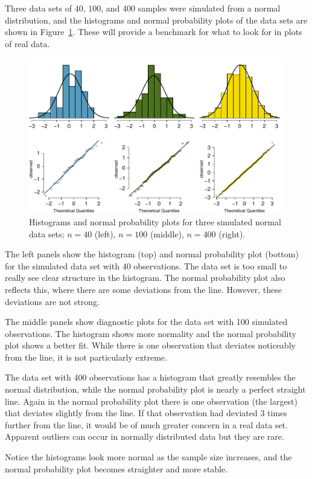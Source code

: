 \begin{example}{Three data sets of 40, 100, and 400 samples were simulated from a normal distribution, and the histograms and normal probability plots of the data sets are shown in Figure~\ref{normalExamples}. These will provide a benchmark for what to look for in plots of real data.} \label{normalExamplesExample}

\begin{figure}
\centering
\includegraphics[width=\textwidth]{02/figures/normalExamples/normalExamples}
\caption{Histograms and normal probability plots for three simulated normal data sets; $n=40$ (left), $n=100$ (middle), $n=400$ (right).}
\label{normalExamples}
\end{figure}

The left panels show the histogram (top) and normal probability plot (bottom) for the simulated data set with 40 observations. The data set is too small to really see clear structure in the histogram. The normal probability plot also reflects this, where there are some deviations from the line. However, these deviations are not strong.

The middle panels show diagnostic plots for the data set with 100 simulated observations. The histogram shows more normality and the normal probability plot shows a better fit. While there is one observation that deviates noticeably from the line, it is not particularly extreme.

The data set with 400 observations has a histogram that greatly resembles the normal distribution, while the normal probability plot is nearly a perfect straight line. Again in the normal probability plot there is one observation (the largest) that deviates slightly from the line. If that observation had deviated 3 times further from the line, it would be of much greater concern in a real data set. Apparent outliers can occur in normally distributed data but they are rare.

Notice the histograms look more normal as the sample size increases, and the normal probability plot becomes straighter and more stable.
\end{example}

